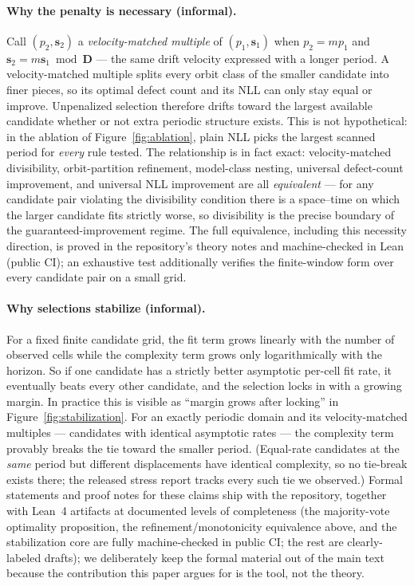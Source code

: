 \documentclass[letterpaper]{article}
\newcommand{\bs}{\mathbf{s}}
\newcommand{\bD}{\mathbf{D}}
\begin{document}
\paragraph{Why the penalty is necessary (informal).}
Call $(p_2,\bs_2)$ a \emph{velocity-matched multiple} of $(p_1,\bs_1)$
when $p_2 = m p_1$ and $\bs_2 = m \bs_1 \bmod \bD$ --- the same drift
velocity expressed with a longer period. A velocity-matched multiple
splits every orbit class of the smaller candidate into finer pieces, so
its optimal defect count and its NLL can only stay equal or improve.
Unpenalized selection therefore drifts toward the largest available
candidate whether or not extra periodic structure exists. This is not
hypothetical: in the ablation of
Figure~\ref{fig:ablation}, plain NLL picks the largest scanned period
for \emph{every} rule tested. The relationship is in fact exact:
velocity-matched divisibility, orbit-partition refinement,
model-class nesting, universal defect-count improvement, and universal
NLL improvement are all \emph{equivalent} --- for any candidate pair
violating the divisibility condition there is a space--time on which the
larger candidate fits strictly worse, so divisibility is the precise
boundary of the guaranteed-improvement regime. The full equivalence,
including this necessity direction, is proved in the repository's
theory notes and machine-checked in Lean (public CI); an exhaustive
test additionally verifies the finite-window form over every candidate
pair on a small grid.

\paragraph{Why selections stabilize (informal).}
For a fixed finite candidate grid, the fit term grows linearly with the
number of observed cells while the complexity term grows only
logarithmically with the horizon. So if one candidate has a strictly
better asymptotic per-cell fit rate, it eventually beats every other
candidate, and the selection locks in with a growing margin. In
practice this is visible as ``margin grows after locking'' in
Figure~\ref{fig:stabilization}. For an exactly periodic domain and
its velocity-matched multiples --- candidates with identical asymptotic
rates --- the complexity term provably breaks the tie toward the smaller
period. (Equal-rate candidates at the \emph{same} period but different
displacements have identical complexity, so no tie-break exists there; the
released stress report tracks every such tie we observed.) Formal
statements and proof notes for these claims ship with the repository,
together with Lean~4 artifacts at documented levels of completeness
(the majority-vote optimality proposition, the refinement/monotonicity
equivalence above, and the stabilization core are fully machine-checked
in public CI; the rest are clearly-labeled drafts); we deliberately
keep the formal material out of the main text because the contribution
this paper argues for is the tool, not the theory.
\end{document}
